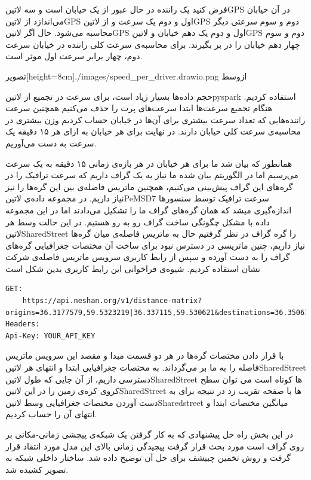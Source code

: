 فرض کنید یک راننده در حال عبور از یک خیابان است و سه  لاتین{‌GPS} در آن خیابان می‌اندازد از  لاتین{GPS} اول و دوم یک سرعت و از  لاتین{‌GPS} دوم و سوم سرعتی دیگر محاسبه می‌شود. حال اگر  لاتین{GPS} اول و دوم یک دهم خیابان و  لاتین{GPS} دوم و سوم چهار دهم خیابان را در بر بگیرند. برای محاسبه‌ی سرعت کلی راننده در خیابان سرعت دوم، چهار برابر سرعت اول موثر است.

  ‌تصویر[height=8cm]{./images/speed_per_driver.drawio.png}
  ‌ازوسط

حجم داده‌ها بسیار زیاد است، برای سرعت در تجمیع از  لاتین{pyspark} استفاده کردیم. هنگام تجمیع سرعت‌ها ابتدا سرعت‌های پرت را حذف می‌کنیم همچنین سرعت راننده‌هایی که تعداد سرعت بیشتری برای آن‌ها در خیابان حساب کردیم وزن بیشتری در محاسبه‌ی سرعت کلی خیابان دارند. در نهایت برای هر خیابان به ازای هر ۱۵ دقیقه یک سرعت به دست می‌آوریم.

همانطور که بیان شد ما برای هر خیابان در هر بازه‌ی زمانی ۱۵ دقیقه به یک سرعت می‌رسیم اما در الگوریتم بیان شده ما نیاز به یک گراف داریم که سرعت ترافیک را در گره‌های این گراف پیش‌بینی می‌کنیم، همچنین ماتریس فاصله‌ی بین این گره‌ها را نیز نیاز داریم. در مجموعه داده‌ی  لاتین{PeMSD7} سرعت ترافیک توسط سنسورها اندازه‌گیری میشد که همان گره‌های گراف ما را تشکیل می‌دادند اما در این مجموعه داده با مشکل چگونگی ساخت گراف رو به رو هستیم. در این حالت وسط هر  لاتین{SharedStreet} را گره گراف در نظر گرفتیم حال به ماتریس فاصله‌ی میان گره‌ها نیاز داریم، چنین ماتریسی در دسترس نبود برای ساخت آن مختصات جغرافیایی گره‌های گراف را به دست آورده و سپس از رابط کاربری سرویس ماتریس فاصله‌ی شرکت نشان استفاده کردیم. شیوه‌ی فراخوانی این رابط کاربری بدین شکل است

\begin{lstlisting}
GET:
    https://api.neshan.org/v1/distance-matrix?origins=36.3177579,59.5323219|36.337115,59.530621&destinations=36.35067,59.5451965|36.337005,59.530021
Headers:
Api-Key: YOUR_API_KEY
\end{lstlisting}

با قرار دادن مختصات گره‌ها در هر دو قسمت مبدا و مقصد این سرویس ماتریس فاصله را به ما بر می‌گرداند. به مختصات جغرافیایی ابتدا و انتهای هر  لاتین{SharedStreet} دسترسی داریم، از آن جایی که طول  لاتین{SharedStreet} ها کوتاه است می توان سطح کروی کره‌ی زمین را در این  لاتین{SharedStreet} ها با صفحه تقریب زد در نتیجه برای به دست آوردن مختصات جغرافیایی وسط  لاتین{Sharedstreet} میانگین مختصات ابتدا و انتهای آن را حساب کردیم.

در این بخش راه حل پیشنهادی که به کار گرفتن یک شبکه‌ی پیچشی زمانی-مکانی بر روی گراف است مورد بحث قرار گرفت پیچیدگی زمانی بالای این مدل مورد انتقاد قرار گرفت و روش تخمین چبیشف برای حل آن توضیح داده شد. ساختار داخلی شبکه به تصویر کشیده شد.
